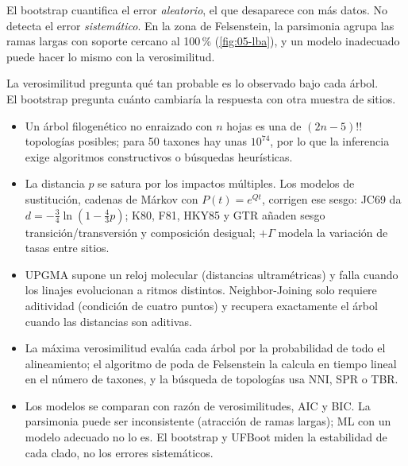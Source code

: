 \begin{cuidado}
El bootstrap cuantifica el error \emph{aleatorio}, el que desaparece con más datos. No detecta el error \emph{sistemático}. En la zona de Felsenstein, la parsimonia agrupa las ramas largas con soporte cercano al 100\,\% (\cref{fig:05-lba}), y un modelo inadecuado puede hacer lo mismo con la verosimilitud.
\end{cuidado}

\begin{ideaclave}
La verosimilitud pregunta qué tan probable es lo observado bajo cada árbol.\\
El bootstrap pregunta cuánto cambiaría la respuesta con otra muestra de sitios.
\end{ideaclave}

\begin{resumen}
\begin{itemize}
  \item Un árbol filogenético no enraizado con $n$ hojas es una de $(2n-5)!!$ topologías posibles; para 50 taxones hay unas $10^{74}$, por lo que la inferencia exige algoritmos constructivos o búsquedas heurísticas.
  \item La distancia $p$ se satura por los impactos múltiples. Los modelos de sustitución, cadenas de Márkov con $P(t)=e^{Qt}$, corrigen ese sesgo: JC69 da $d=-\frac34\ln(1-\frac43p)$; K80, F81, HKY85 y GTR añaden sesgo transición/transversión y composición desigual; $+\Gamma$ modela la variación de tasas entre sitios.
  \item UPGMA supone un reloj molecular (distancias ultramétricas) y falla cuando los linajes evolucionan a ritmos distintos. Neighbor-Joining solo requiere aditividad (condición de cuatro puntos) y recupera exactamente el árbol cuando las distancias son aditivas.
  \item La máxima verosimilitud evalúa cada árbol por la probabilidad de todo el alineamiento; el algoritmo de poda de Felsenstein la calcula en tiempo lineal en el número de taxones, y la búsqueda de topologías usa NNI, SPR o TBR.
  \item Los modelos se comparan con razón de verosimilitudes, AIC y BIC. La parsimonia puede ser inconsistente (atracción de ramas largas); ML con un modelo adecuado no lo es. El bootstrap y UFBoot miden la estabilidad de cada clado, no los errores sistemáticos.
\end{itemize}
\end{resumen}

